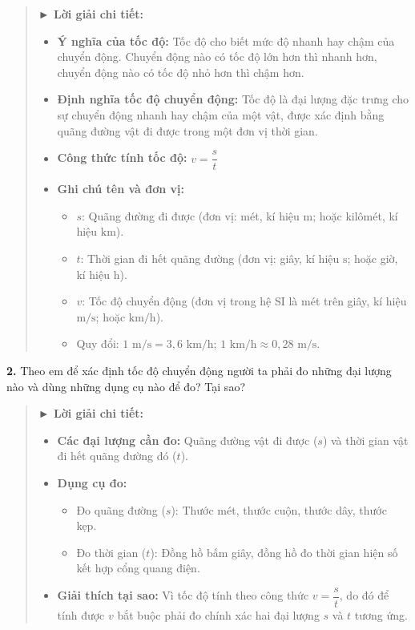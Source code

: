 \documentclass[11pt,a4paper]{article}
\begin{document}
\begin{quote}\small
{\color{myBlue}\textbf{► Lời giải chi tiết:}}
\begin{itemize}[leftmargin=*,itemsep=1pt,topsep=1pt]
  \item \textbf{Ý nghĩa của tốc độ:} Tốc độ cho biết mức độ nhanh hay chậm của chuyển động. Chuyển động nào có tốc độ lớn hơn thì nhanh hơn, chuyển động nào có tốc độ nhỏ hơn thì chậm hơn.
  \item \textbf{Định nghĩa tốc độ chuyển động:} Tốc độ là đại lượng đặc trưng cho sự chuyển động nhanh hay chậm của một vật, được xác định bằng quãng đường vật đi được trong một đơn vị thời gian.
  \item \textbf{Công thức tính tốc độ:} $v = \dfrac{s}{t}$
  \item \textbf{Ghi chú tên và đơn vị:}
    \begin{itemize}
      \item $s$: Quãng đường đi được (đơn vị: mét, kí hiệu $\text{m}$; hoặc kilômét, kí hiệu $\text{km}$).
      \item $t$: Thời gian đi hết quãng đường (đơn vị: giây, kí hiệu $\text{s}$; hoặc giờ, kí hiệu $\text{h}$).
      \item $v$: Tốc độ chuyển động (đơn vị trong hệ SI là mét trên giây, kí hiệu $\text{m/s}$; hoặc $\text{km/h}$).
      \item Quy đổi: $1\text{ m/s} = 3{,}6\text{ km/h}$; $1\text{ km/h} \approx 0{,}28\text{ m/s}$.
    \end{itemize}
\end{itemize}
\end{quote}

\textbf{2.} Theo em để xác định tốc độ chuyển động người ta phải đo những đại lượng nào và dùng những dụng cụ nào để đo? Tại sao?

\begin{quote}\small
{\color{myBlue}\textbf{► Lời giải chi tiết:}}
\begin{itemize}[leftmargin=*,itemsep=1pt,topsep=1pt]
  \item \textbf{Các đại lượng cần đo:} Quãng đường vật đi được ($s$) và thời gian vật đi hết quãng đường đó ($t$).
  \item \textbf{Dụng cụ đo:}
    \begin{itemize}
      \item Đo quãng đường ($s$): Thước mét, thước cuộn, thước dây, thước kẹp.
      \item Đo thời gian ($t$): Đồng hồ bấm giây, đồng hồ đo thời gian hiện số kết hợp cổng quang điện.
    \end{itemize}
  \item \textbf{Giải thích tại sao:} Vì tốc độ tính theo công thức $v = \dfrac{s}{t}$, do đó để tính được $v$ bắt buộc phải đo chính xác hai đại lượng $s$ và $t$ tương ứng.
\end{itemize}
\end{quote}
\end{document}
